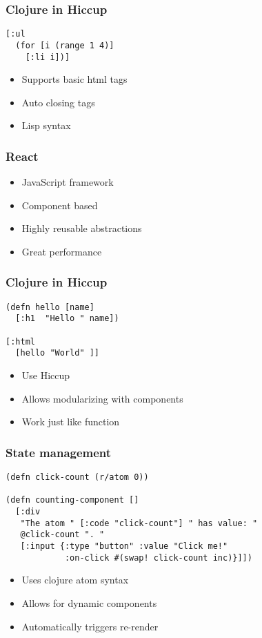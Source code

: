 \documentclass{beamer}
\begin{document}
  \begin{frame}[fragile]
    \frametitle{Clojure in Hiccup}
    \begin{verbatim}
[:ul
  (for [i (range 1 4)]
    [:li i])]
    \end{verbatim}
    \begin{itemize}
      \item Supports basic html tags
      \item Auto closing tags
      \item Lisp syntax
    \end{itemize}
  \end{frame}

  \begin{frame}
    \frametitle{React}
    \begin{itemize}
      \item JavaScript framework
      \item Component based
      \item Highly reusable abstractions
      \item Great performance
    \end{itemize}
  \end{frame}

  \begin{frame}[fragile]
    \frametitle{Clojure in Hiccup}
    \begin{verbatim}
(defn hello [name]
  [:h1  "Hello " name])

[:html
  [hello "World" ]]
    \end{verbatim}
    \begin{itemize}
      \item Use Hiccup
      \item Allows modularizing with components
      \item Work just like function
    \end{itemize}
  \end{frame}

  \begin{frame}[fragile]
    \frametitle{State management}
    \begin{verbatim}
(defn click-count (r/atom 0))

(defn counting-component []
  [:div
   "The atom " [:code "click-count"] " has value: "
   @click-count ". "
   [:input {:type "button" :value "Click me!"
            :on-click #(swap! click-count inc)}]])
    \end{verbatim}
    \begin{itemize}
      \item Uses clojure atom syntax
      \item Allows for dynamic components
      \item Automatically triggers re-render
    \end{itemize}
  \end{frame}
\end{document}

